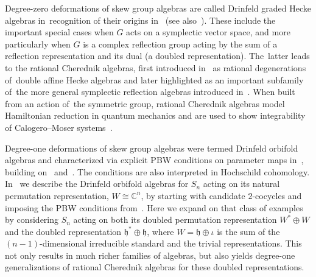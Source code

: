 \documentclass[pdftex]{sigma}
\numberwithin{equation}{section}
\begin{document}
Degree-zero deformations of skew group algebras are called Drinfeld graded Hecke algebras in~recognition of their origins in~\cite{Drinfeld1986} (see also~\cite{Lusztig1988}).
These include the important special cases when $G$ acts on a symplectic vector space,
and more particularly when $G$ is a complex reflection group acting by the sum of a
reflection representation and its dual (a doubled representation). The~lat\-ter leads
to the rational Cherednik algebras, first introduced in~\cite{Cherednik1991} as rational
dege\-ne\-ra\-tions of~double affine Hecke algebras and later highlighted as an important
subfamily of~the more general symplectic reflection algebras introduced in~\cite{EtingofGinzburg2002}.
When built from an action of~the symmetric group, rational Cherednik
algebras model Hamiltonian reduction in quantum mechanics and are used to show
integrability of Calogero--Moser systems~\cite{Etingof2007}.

Degree-one deformations of skew group algebras were termed Drinfeld orbifold algebras and
characterized via explicit PBW conditions on parameter maps in~\cite{SWorbifold}, building on~\cite{Bergman1978} and~\cite{BravermanGaitsgory}.
The conditions are also interpreted in Hochschild cohomology.
In~\cite{FGK} we describe the Drinfeld orbifold algebras for $S_n$ acting on its natural
permutation representation, $W\cong \mathbb{C}^n$, by starting with candidate $2$-cocycles and imposing the
PBW conditions from~\cite{SWorbifold}.
Here we expand on that class of examples by considering $S_n$
acting on both its doubled permutation representation $W^*\oplus W$ and the doubled representation
$\mathfrak{h}^*\oplus \mathfrak{h}$, where $W=\mathfrak{h} \oplus \iota$ is the sum of the $(n-1)$-dimensional irreducible
standard and the trivial representations. This not only results in much richer families
of algebras, but also yields degree-one generalizations of rational Cherednik algebras for these
doubled representations.
\end{document}
